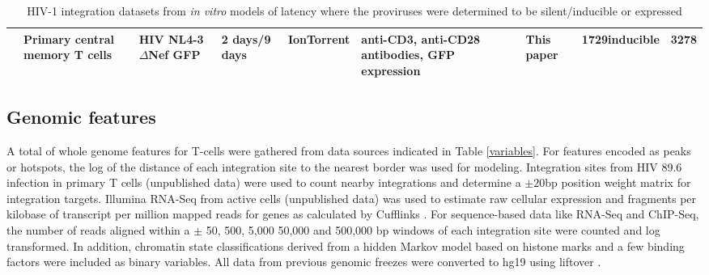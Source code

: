 \documentclass[../sherrill-Mix_thesis.tex]{subfiles}
\begin{document}
\begin{table}
{\begin{tabular}{|p{0.49in}|p{0.53in}|p{0.8in}|P{0.6in}|p{0.6in}|P{0.75in}|P{0.59in}|p{0.59in}|p{0.6in}|}
			\hline     
			\Memory{}         & Primary central memory \cdFour{} T cells             & HIV NL4-3 $\Delta$Nef GFP                                                                      & 2 days/9 days                            & Ion\-Torrent                 & anti-CD3, anti-CD28 antibodies, GFP expression         & This paper           &  1729\newline inducible                                   & 3278                                \\ 
			\hline
		\end{tabular}
	}
	\caption[Integrations from \textit{in vitro} models of latency]{HIV-1 integration datasets from \textit{in vitro} models of latency where the proviruses were determined to be silent/inducible or expressed}
	\label{samples}
	\end{table}

	\subsection{Genomic features}
		A total of \nFeatures{} whole genome features for \cdFour{} T-cells were gathered from data sources indicated in Table \ref{variables}.  For features encoded as peaks or hotspots, the log of the distance of each integration site to the nearest border was used for modeling. Integration sites from HIV 89.6 infection in primary \cdFour{} T cells (unpublished data) were used to count nearby integrations and determine a $\pm20$bp position weight matrix for integration targets. Illumina RNA-Seq from active \cdFour{} cells (unpublished data) was used to estimate raw cellular expression and fragments per kilobase of transcript per million mapped reads for genes as calculated by Cufflinks \citep{Trapnell2010}. For sequence-based data like RNA-Seq and ChIP-Seq, the number of reads aligned within a $\pm$ 50, 500, 5,000 50,000 and 500,000 bp windows of each integration site were counted and log transformed. In addition, chromatin state classifications derived from a hidden Markov model based on histone marks and a few binding factors \citep{Ernst2010} were included as binary variables. All data from previous genomic freezes were converted to hg19 using liftover \citep{Hinrichs2006}. 
\end{document}

